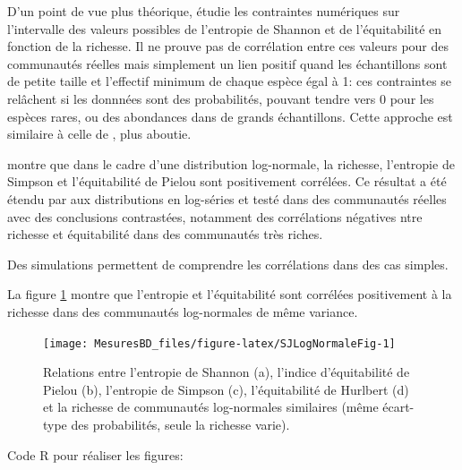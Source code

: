 \documentclass[
  11pt,
  french,
  a4paper,
  extrafontsizes,onecolumn,openright
  ]{memoir}
\begin{document}
D'un point de vue plus théorique, \textcite{DeBenedictis1973} étudie les contraintes numériques sur l'intervalle des valeurs possibles de l'entropie de Shannon et de l'équitabilité en fonction de la richesse.
Il ne prouve pas de corrélation entre ces valeurs pour des communautés réelles mais simplement un lien positif quand les échantillons sont de petite taille et l'effectif minimum de chaque espèce égal à 1: ces contraintes se relâchent si les donnnées sont des probabilités, pouvant tendre vers 0 pour les espèces rares, ou des abondances dans de grands échantillons.
Cette approche est similaire à celle de \textcite{Jost2010}, plus aboutie.

\textcite{May1975} montre que dans le cadre d'une distribution log-normale, la richesse, l'entropie de Simpson et l'équitabilité de Pielou sont positivement corrélées.
Ce résultat a été étendu par \textcite{Stirling2001} aux distributions en log-séries et testé dans des communautés réelles avec des conclusions contrastées, notamment des corrélations négatives ntre richesse et équitabilité dans des communautés très riches.

Des simulations permettent de comprendre les corrélations dans des cas simples.

La figure \ref{fig:SJLogNormaleFig} montre que l'entropie et l'équitabilité sont corrélées positivement à la richesse dans des communautés log-normales de même variance.



\scriptsize

\begin{figure}

{\centering \texttt{[image: MesuresBD\_files/figure-latex/SJLogNormaleFig-1]} 

}

\caption{Relations entre l'entropie de Shannon (a), l'indice d'équitabilité de Pielou (b), l'entropie de Simpson (c), l'équitabilité de Hurlbert (d) et la richesse de communautés log-normales similaires (même écart-type des probabilités, seule la richesse varie).}\label{fig:SJLogNormaleFig}
\end{figure}

\normalsize

Code R pour réaliser les figures:

\scriptsize
\end{document}
